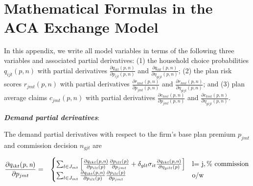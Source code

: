 \documentclass[12pt]{article}
\begin{document}
\newpage

\section{Mathematical Formulas in the ACA Exchange Model}\label{app::model_formulas}

\noindent In this appendix, we write all model variables in terms of the following three variables and associated partial derivatives: (1) the household choice probabilities $q_{ijt}(\textit{p},\textit{n})$ with partial derivatives $\frac{ \partial q_{ikt}(\textit{p},\textit{n})}{\partial p_{ijt}(\textit{p},\textit{n})}$ and $\frac{\partial q_{ikt}(\textit{p},\textit{n})}{\partial \eta_{gijt}(\textit{p},\textit{n})}$; (2) the plan risk scores $r_{jmt}(\textit{p},\textit{n})$ with partial derivatives $\frac{\partial r_{kmt}(\textit{p},\textit{n})}{\partial p_{jmt}(\textit{p},\textit{n})}$ and $\frac{\partial r_{kmt}(\textit{p},\textit{n})}{\partial \eta_{gijt}(\textit{p},\textit{n})}$; and (3) plan average claims $c_{jmt}(\textit{p},\textit{n})$ with partial derivatives $ \frac{\partial c_{kmt}(\textit{p},\textit{n})}{\partial p_{jmt}(\textit{p},\textit{n})}$ and $\frac{\partial c_{kmt}(\textit{p},\textit{n})}{\partial \eta_{gijt}(\textit{p},\textit{n})}$.		
	
\noindent \textit{\bf Demand partial derivatives}:

\noindent The demand partial derivatives with respect to the firm's base plan premium $p_{jmt}$ and commission decision $n_{gjt}$ are 	
	
\vspace{-0.4in}		
		
		\begin{eqnarray*}
		\frac{\partial q_{ikt}(\textit{p},\textit{n})}{\partial p_{jmt}} &=& \begin{cases} \sum_{l \in J_{mt}} \left[ \frac{ \partial q_{ikt}(\textit{p},\textit{n})}{\partial p_{ilt}(\textit{p})}\frac{ \partial p_{ilt}(\textit{p})}{\partial p_{jmt}} +  \delta_{glt} \sigma_{it} \frac{ \partial q_{ikt}(\textit{p},\textit{n})}{\partial \eta_{gilt}(\textit{p})}  \right] & $l= j$, \mathrm{\% \,\, commission} \\
		\sum_{l \in J_{mt}}  \frac{ \partial q_{ikt}(\textit{p},\textit{n})}{\partial p_{ilt}(\textit{p})}\frac{ \partial p_{ilt}(\textit{p})}{\partial p_{jmt}}  & \mathrm{o/w} 
		\end{cases}
		\end{eqnarray*}
		
		
	\vspace{-0.4in}
	\singlespacing	
\end{document}
